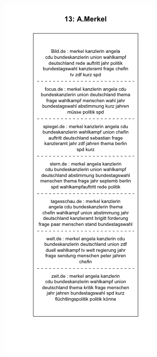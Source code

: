 \documentclass[12pt,a4paper,notitlepage]{article}
\begin{document}
{%
\begin{figure}[H]
	\begin{center}
		\begin{subfigure}[normla]{0.49\textwidth}
			\includegraphics[width=\textwidth]{../figs/plotquote13.png}

\end{subfigure}
\end{center}
\end{figure}}
\end{document}
